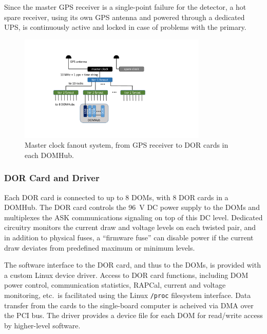 Since the master GPS receiver is a single-point failure for the detector, a
hot spare receiver, using its own GPS antenna and powered through a
dedicated UPS, is continuously active and locked in case of problems with
the primary.

\begin{figure}[!h]
 \centering
 \includegraphics[width=0.8\textwidth]{graphics/online/data_readout/clock_fanout.pdf}
 \caption{Master clock fanout system, from GPS receiver to DOR cards in
   each DOMHub.}
 \label{fig:clock_fanout}
\end{figure}


\subsubsection{DOR Card and Driver}

Each DOR card is connected to up to 8 DOMs, with 8 DOR cards in a
DOMHub. The
DOR card controls the 96~V DC power supply to the DOMs and multiplexes the
ASK communications signaling on top of this DC level.  Dedicated circuitry
monitors the current draw and voltage levels on each twisted pair, and in
addition to physical fuses, a ``firmware fuse'' can disable power if the
current draw deviates from predefined maximum or minimum levels.

The software interface to the DOR card, and thus to the DOMs, is provided
with a custom Linux device driver.  Access to DOR card functions,
including DOM power control, communication statistics, RAPCal, current and
voltage monitoring, etc.~is facilitated using the Linux \texttt{/proc}
filesystem interface.  Data transfer from the cards to the single-board
computer is acheived via DMA over the PCI bus.  The driver provides a
device file for each DOM for read/write access by higher-level software.

